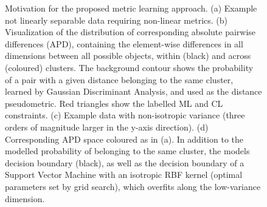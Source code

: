 \documentclass[12pt,PhD,twoside]{muthesis}
\begin{document}
\begin{figure}[t]
	\centering
	
	
	\caption[Motivation for the proposed metric learning approach]{Motivation for the proposed metric learning approach. (a) Example not linearly separable data requiring non-linear metrics. (b) Visualization of the distribution of corresponding absolute pairwise differences (APD), containing the element-wise differences in all dimensions between all possible objects, within (black) and across (coloured) clusters. The background contour shows the probability of a pair with a given distance belonging to the same cluster, learned by Gaussian Discriminant Analysis, and used as the distance pseudometric. Red triangles show the labelled ML and CL constraints. (c) Example data with non-isotropic variance (three orders of magnitude larger in the y-axis direction). (d) Corresponding APD space coloured as in (a). In addition to the modelled probability of belonging to the same cluster, the models decision boundary (black), as well as the decision boundary of a Support Vector Machine with an isotropic RBF kernel (optimal parameters set by grid search), which overfits along the low-variance dimension.}
	\label{fig:motivation}
\end{figure}
 
\end{document}
